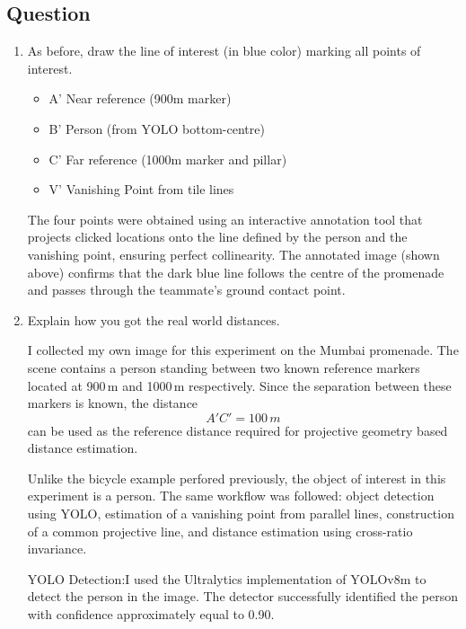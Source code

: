 \subsection{Question}
\begin{enumerate}

\item As before, draw the line of interest (in blue color) marking all points of interest. 
\begin{studentSpace}
    \begin{itemize}
        \item A' Near reference (900m marker) 
        \item B' Person (from YOLO bottom-centre)
        \item C' Far reference (1000m marker and pillar)
        \item V' Vanishing Point from tile lines
    \end{itemize} 
    \par The four points were obtained using an interactive annotation tool that projects clicked locations onto the line defined by the person and the vanishing point, ensuring perfect collinearity. The annotated image (shown above) confirms that the dark blue line follows the centre of the promenade and passes through the teammate’s ground contact point.   
\end{studentSpace}
  
\item Explain how you got the real world distances.
\begin{studentSpace}
    \par I collected my own image for this experiment on the Mumbai promenade. The scene contains a person standing between two known reference markers located at 900\,m and 1000\,m respectively. Since the separation between these markers is known, the distance
    \[A'C' = 100\,m\]
    can be used as the reference distance required for projective geometry based distance estimation.
    
    Unlike the bicycle example perfored previously, the object of interest in this experiment is a person. The same workflow was followed: object detection using YOLO, estimation of a vanishing point from parallel lines, construction of a common projective line, and distance estimation using cross-ratio invariance.

    YOLO Detection:I used the Ultralytics implementation of YOLOv8m to detect the person in the image. The detector successfully identified the person with confidence approximately equal to 0.90.
    

\end{studentSpace}
\end{enumerate}
